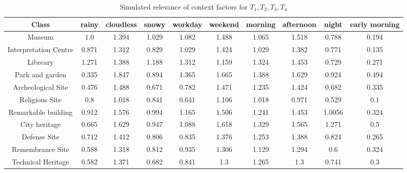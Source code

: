 \begin{table}[h!]
\centering
\footnotesize{
\caption{Simulated relevance of context factors for $T_1, T_2, T_3, T_4$
}
\label{table:relevances-experiment}
\vspace{-0.2cm}
\begin{tabular}{ |c|c|c|c|c|c|c|c|c|c| } 
    \hline
    \textbf{Class} & \textbf{rainy} & \textbf{cloudless} & \textbf{snowy} & \textbf{workday} & \textbf{weekend} & \textbf{morning} & \textbf{afternoon} & \textbf{night} & \textbf{early morning} \\
    \hline
    \hline

    Museum & 1.0 & 1.394 & 1.029 & 1.082 & 1.488 & 1.065 & 1.518 & 0.788 & 0.194 \\ \hline
    
    Interpretation Centre & 0.871 & 1.312 & 0.829 & 1.029 & 1.424 & 1.029  & 1.382 & 0.771 & 0.135 \\ \hline

    Libreary & 1.271 & 1.388  & 1.188  & 1.312 &1.159 & 1.324 & 1.453 & 0.729  & 0.271 \\ \hline

    Park and garden &
    0.335 & 1.847  & 0.894 & 1.365 & 1.665 & 1.388  & 1.629 & 0.924 & 0.494  \\ \hline

    Archeological Site &
    0.476 & 1.488 & 0.671 & 0.782 & 1.471 & 1.235 & 1.424 & 0.682  & 0.335 \\ \hline

    Religious Site &
    0.8 & 1.018 & 0.841  & 0.641  & 1.106 & 1.018 & 0.971 & 0.529  & 0.1 \\ \hline

    Remarkable building &
    0.912 & 1.576  & 0.994  & 1.165 & 1.506 & 1.241  & 1.453 & 1.0056 & 0.324 \\ \hline
    
    City heritage &
    0.665 & 1.629  & 0.947  & 1.088  & 1.618 & 1.329  & 1.565 & 1.271 & 0.5 \\ \hline
    
    Defense Site &
    0.712 & 1.412 & 0.806 & 0.835  & 1.376  & 1.253 & 1.388  & 0.824 & 0.265 \\ \hline
    
    Remembrance Site &
    0.588  & 1.318 & 0.812 & 0.935  & 1.306 & 1.129  & 1.294  & 0.6 & 0.324 \\ \hline
    
    Technical Heritage &
    0.582  & 1.371 & 0.682  & 0.841  & 1.3 & 1.265 & 1.3 & 0.741  & 0.3 \\ \hline
    

\end{tabular}}
\end{table}
